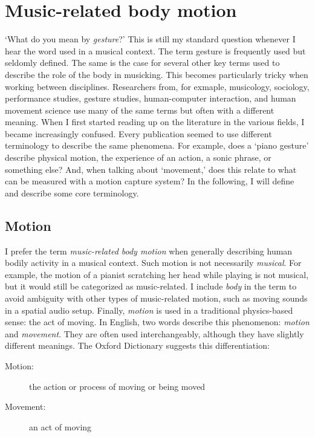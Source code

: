 \chapter{Music-related body motion}\label{chap:motion}

`What do you mean by \emph{gesture}?' This is still my standard question whenever I hear the word used in a musical context. The term gesture is frequently used but seldomly defined. The same is the case for several other key terms used to describe the role of the body in musicking. This becomes particularly tricky when working between disciplines. Researchers from, for exmaple, musicology, sociology, performance studies, gesture studies, human-computer interaction, and human movement science use many of the same terms but often with a different meaning. When I first started reading up on the literature in the various fields, I became increasingly confused. Every publication seemed to use different terminology to describe the same phenomena. For example, does a `piano gesture' describe physical motion, the experience of an action, a sonic phrase, or something else? And, when talking about `movement,' does this relate to what can be measured with a motion capture system? In the following, I will define and describe some core terminology.


\section{Motion}

I prefer the term \emph{music-related body motion} when generally describing human bodily activity in a musical context. Such motion is not necessarily \emph{musical}. For example, the motion of a pianist scratching her head while playing is not musical, but it would still be categorized as music-related. I include \emph{body} in the term to avoid ambiguity with other types of music-related motion, such as moving sounds in a spatial audio setup. Finally, \emph{motion} is used in a traditional physics-based sense: the act of moving. In English, two words describe this phenomenon: \emph{motion} and \emph{movement}. They are often used interchangeably, although they have slightly different meanings. The Oxford Dictionary suggests this differentiation:

\begin{description}
\item[Motion:] the action or process of moving or being moved
\item[Movement:] an act of moving
\end{description}

